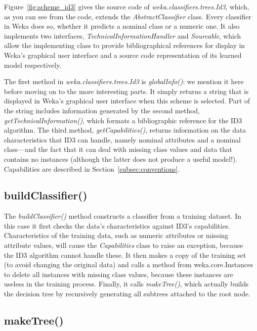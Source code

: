 Figure~\ref{fig:scheme_id3} gives the source code
of \textit{weka.classifiers.trees.Id3}, which, as you can see from the
code, extends the \textit{AbstractClassifier} class. Every classifier
in Weka does so, whether it predicts a nominal class or a numeric
one. It also implements two
interfaces, \textit{TechnicalInformationHandler}
and \textit{Sourcable}, which allow the implementing class to provide
bibliographical references for display in Weka's graphical user
interface and a source code representation of its learned model
respectively.

The first method in \textit{weka.classifiers.trees.Id3}
is \textit{globalInfo()}: we mention it here before moving on to the
more interesting parts. It simply returns a string that is displayed
in Weka's graphical user interface when this scheme is selected. Part
of the string includes information generated by the second method,
\textit{getTechnicalInformation()}, which formats a bibliographic reference for
the ID3 algorithm. The third
method, \textit{getCapabilities()}, returns information on the data
characteristics that ID3 can handle, namely nominal
attributes and a nominal class---and the fact that it can deal with
missing class values and data that contains no instances (although the
latter does not produce a useful model!). Capabilities are described
in Section~\ref{subsec:conventions}.

\subsection{buildClassifier()}

The \textit{buildClassifier()} method constructs a classifier from a
training dataset. In this case it first checks the data’s
characteristics against ID3's capabilities. Characteristics of the
training data, such as numeric attributes or missing attribute values,
will cause the \textit{Capabilities} class to raise an exception,
because the ID3 algorithm cannot handle these. It then makes a copy of
the training set (to avoid changing the original data) and calls a
method from weka.core.Instances to delete all instances with missing
class values, because these instances are useless in the training
process. Finally, it calls \textit{makeTree()}, which actually builds
the decision tree by recursively generating all subtrees attached to
the root node.

\subsection{makeTree()}

